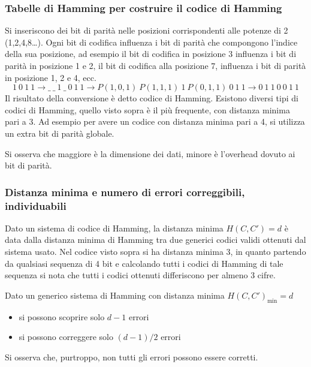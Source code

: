 \documentclass[a4paper]{article}
\begin{document}
\subsubsection*{Tabelle di Hamming per costruire il codice di Hamming}
Si inseriscono dei bit di parità nelle posizioni corrispondenti alle potenze di 2 (1,2,4,8\dots). Ogni bit di codifica influenza
i bit di parità che compongono l'indice della sua posizione, ad esempio il bit di codifica in posizione 3 influenza i bit di 
parità in posizione 1 e 2, il bit di codifica alla posizione 7, influenza i bit di parità in posizione 1, 2 e 4, ecc.
\[1\ 0\ 1\ 1 \rightarrow \_\ \_\ 1\ \_\ 0\ 1\ 1 \rightarrow P(1,0,1)\ P(1,1,1)\ 1\ P(0,1,1)\ 0\ 1\ 1 \rightarrow 0\ 1\ 1\ 0\ 0\ 1\ 1\]
Il risultato della conversione è detto codice di Hamming. Esistono diversi tipi di codici di Hamming, quello visto sopra è
il più frequente, con distanza minima pari a 3. Ad esempio per avere un codice con distanza minima pari a 4, si utilizza un
extra bit di parità globale.

Si osserva che maggiore è la dimensione dei dati, minore è l'overhead dovuto ai bit di parità.

\subsubsection*{Distanza minima e numero di errori correggibili, individuabili}
Dato un sistema di codice di Hamming, la distanza minima \(H(C,C') = d\) è data dalla distanza minima di Hamming tra due
generici codici validi ottenuti dal sistema usato. Nel codice visto sopra si ha distanza minima 3, in quanto partendo da
qualsiasi sequenza di 4 bit e calcolando tutti i codici di Hamming di tale sequenza si nota che tutti i codici ottenuti
differiscono per almeno 3 cifre.

Dato un generico sistema di Hamming con distanza minima \(H(C,C')_\text{min} = d\)
\begin{itemize}
	\item si possono scoprire solo \(d-1\) errori
	\item si possono correggere solo \((d-1)/2\) errori
\end{itemize}
Si osserva che, purtroppo, non tutti gli errori possono essere corretti.

\newpage

\end{document}
